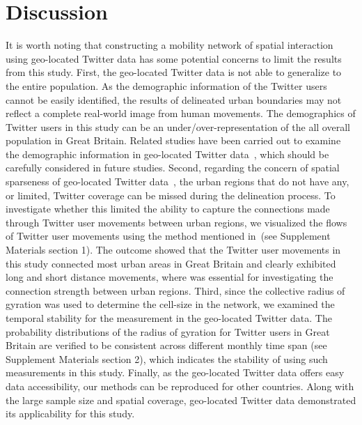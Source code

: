 \documentclass[]{tGIS2e}
\begin{document}
\section{Discussion}
It is worth noting that constructing a mobility network of spatial interaction using geo-located Twitter data has some potential concerns to limit the results from this study.
First, the geo-located Twitter data is not able to generalize to the entire population.
As the demographic information of the Twitter users cannot be easily identified, the results of delineated urban boundaries may not reflect a complete real-world image from human movements. 
The demographics of Twitter users in this study can be an under/over-representation of the all overall population in Great Britain.
Related studies have been carried out to examine the demographic information in geo-located Twitter data~\citep{steiger2015,luo2016,huang2016}, which should be carefully considered in future studies.
Second, regarding the concern of spatial sparseness of geo-located Twitter data~\citep{steiger2015}, the urban regions that do not have any, or limited, Twitter coverage can be missed during the delineation process.
To investigate whether this limited the ability to capture the connections made through Twitter user movements between urban regions, we visualized the flows of Twitter user movements using the method mentioned in~\citep{rae2009}(see Supplement Materials section 1). 
The outcome showed that the Twitter user movements in this study connected most urban areas in Great Britain and clearly exhibited long and short distance movements, where was essential for investigating the connection strength between urban regions.   
Third, since the collective radius of gyration was used to determine the cell-size in the network, we examined the temporal stability for the measurement in the geo-located Twitter data.
The probability distributions of the radius of gyration for Twitter users in Great Britain are verified to be consistent across different monthly time span (see Supplement Materials section 2), which indicates the stability of using such measurements in this study.  
Finally, as the geo-located Twitter data offers easy data accessibility, our methods can be reproduced for other countries. 
Along with the large sample size and spatial coverage, geo-located Twitter data demonstrated its applicability for this study.
\end{document}
